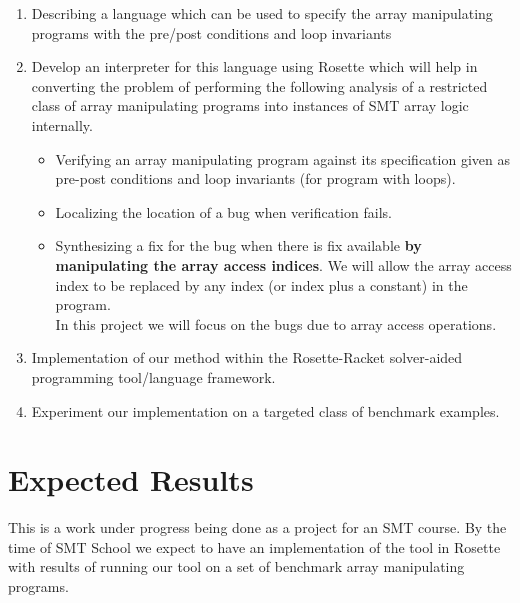 \documentclass[a4paper, 12pt, notitlepage] {article}
\newcommand{\hide}[1]{}
\begin{document}
\begin{enumerate}
	\item  Describing a language which can be used to specify the array manipulating programs with the pre/post conditions and loop invariants \\
	\item Develop an interpreter for this language using Rosette which will help in converting the problem of performing the following analysis of a restricted class of array manipulating programs into instances of SMT array logic internally.
	\begin{itemize}
		\item Verifying an array manipulating program against its specification given as pre-post conditions and loop invariants (for program with loops).
		\item Localizing the location of a bug when verification fails.
		\item Synthesizing a fix for the bug when there is fix available {\bf by manipulating the array access indices}. We will allow the array access index to be replaced by any index (or index plus a constant) in the program. \\
		In this project we will focus on the bugs due to array access operations.
	\end{itemize}
	
	\item Implementation of our method within the Rosette-Racket solver-aided programming tool/language framework.\
	
	\item Experiment our implementation on a targeted class of benchmark examples.
\end{enumerate}


\section{Expected Results}
This is a work under progress being done as a project for an SMT course.
By the time of SMT School we expect to have an implementation of the tool in Rosette with results of running our tool on a set of benchmark array manipulating programs.
\hide{
We expect to have a system which can take simple array programs and help the user with verification, debugging and synthesis provided they give either pre/post conditions along with the loop invariants.
\\
Almost all the programs use arrays in one way or another, but most of the useful programs involving arrays also have loops. At least for now, our plan is not to indulge with loops. We might consider the loops if we are successful in the first phase of our project. 
}
\end{document}
